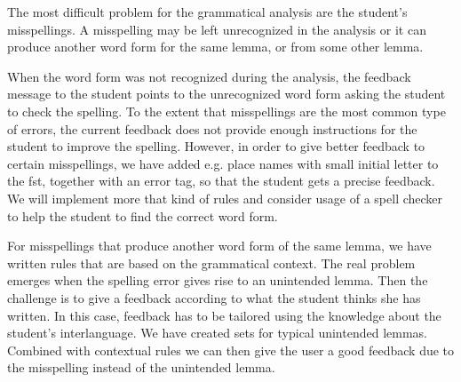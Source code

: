 \documentclass[11pt]{article}
\begin{document}
The most difficult problem for the grammatical analysis are the student's misspellings. A misspelling may be left unrecognized in the analysis or it can produce another word form for the same lemma, or from some other lemma. 

When the word form was not recognized during the analysis, the feedback message to the student points to the unrecognized word form asking the student to check the spelling. To the extent that misspellings are the most common type of errors, the current feedback does not provide enough instructions for the student to improve the spelling. However, in order to give better feedback to certain misspellings, we have added e.g. place names with small initial letter to the fst, together with an error tag, so that the student gets a precise feedback. We will implement more that kind of rules and consider usage of a spell checker to help the student to find the correct word form.


For misspellings that produce another word form of the same lemma, we have written rules that are based on the grammatical context. The real problem emerges when the spelling error gives rise to an unintended lemma. Then the challenge is to give a feedback according to what the student thinks she has written. In this case, feedback has to be tailored using the knowledge about the student’s interlanguage. We have created sets for typical unintended lemmas. Combined with contextual rules we can then give the user a good feedback due to the misspelling instead of the unintended lemma.
\end{document}
